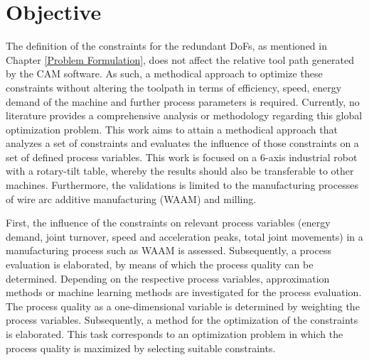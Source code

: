 \section{Objective}\label{OBJECTIVE}
The definition of the constraints for the redundant \acrshort{DoF}s, as mentioned in Chapter \ref{Problem Formulation}, does not affect the relative tool path generated by the \acrshort{CAM} software. As such, a methodical approach to optimize these constraints without altering the toolpath in terms of efficiency, speed, energy demand of the machine and further process parameters is required. Currently, no literature provides a comprehensive analysis or methodology regarding this global optimization problem.
This work aims to attain a methodical approach that analyzes a set of constraints and evaluates the influence of those constraints on a set of defined process variables. This work is focused on a 6-axis industrial robot with a rotary-tilt table, whereby the results should also be transferable to other machines. Furthermore, the validations is limited to the manufacturing processes of wire arc additive manufacturing (\acrshort{WAAM}) and milling. 


First, the influence of the constraints on relevant process variables (energy demand, joint turnover, speed and acceleration peaks, total joint movements) in a manufacturing process such as \acrshort{WAAM} is assessed. Subsequently, a process evaluation is elaborated, by means of which the process quality can be determined. Depending on the respective process variables, approximation methods or machine learning methods are investigated for the process evaluation. The process quality as a one-dimensional variable is determined by weighting the process variables. Subsequently, a method for the optimization of the constraints is elaborated. This task corresponds to an optimization problem in which the process quality is maximized by selecting suitable constraints. 
